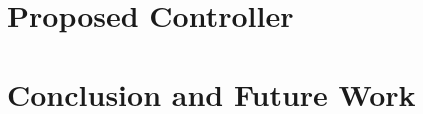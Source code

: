 \documentclass[a4paper,12pt,twoside,openright]{report}
\begin{document}
\chapter{Proposed Controller} \label{chap:proposed}

\chapter{Conclusion and Future Work} \label{chap:conclusion}


\renewcommand\bibname{References} 
{}
{}
\printbibliography
%
\end{document}
